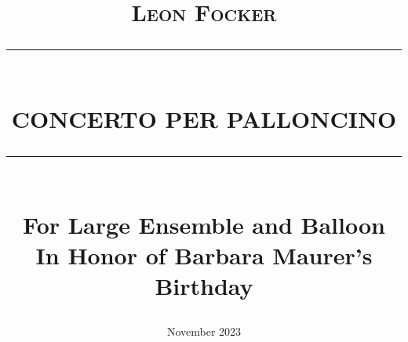 \documentclass[12pt]{report}
\newcommand{\HRule}[1]{\rule{\linewidth}{#1}}
\begin{document}
\title{ \normalsize \textsc{Leon Focker}
		\HRule{0.5pt} \\
		\LARGE \textbf{\uppercase{Concerto per Palloncino}}
		\HRule{2pt} \\ [0.5cm]
                \normalsize For Large Ensemble and Balloon \\ [4.0cm]
		\large In Honor of Barbara Maurer's Birthday \vspace*{5\baselineskip}
              \\ [3.35cm]}

\author{November 2023 }    
\date{}         
\maketitle
\end{document}

